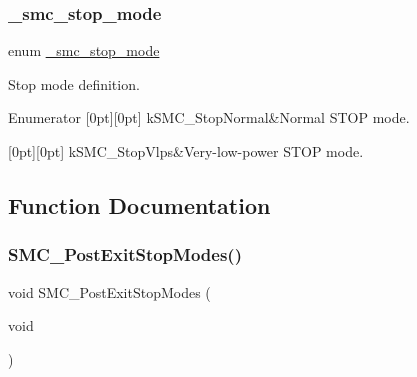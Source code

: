 \subsubsection{\texorpdfstring{\_smc\_stop\_mode}{\_smc\_stop\_mode}}
{\footnotesize\ttfamily enum \mbox{\hyperlink{group__smc_ga107d1c64902b4a1a0270a51008b854d5}{\+\_\+smc\+\_\+stop\+\_\+mode}}}



Stop mode definition. 

\begin{DoxyEnumFields}{Enumerator}
[0pt][0pt]{}\mbox{\label{group__smc_gga107d1c64902b4a1a0270a51008b854d5ac642d13640f334c1c509aa89568028dc}} 
k\+S\+M\+C\+\_\+\+Stop\+Normal&Normal S\+T\+OP mode. \\
\hline

[0pt][0pt]{}\mbox{\label{group__smc_gga107d1c64902b4a1a0270a51008b854d5a0309375b2672e8c29eebd50bd80236c3}} 
k\+S\+M\+C\+\_\+\+Stop\+Vlps&Very-\/low-\/power S\+T\+OP mode. \\
\hline

\end{DoxyEnumFields}


\subsection{Function Documentation}
\mbox{\label{group__smc_ga2ce7e977d78cbc1c355aea3b7acb1b4e}} 
\subsubsection{\texorpdfstring{SMC\_PostExitStopModes()}{SMC\_PostExitStopModes()}}
{\footnotesize\ttfamily void S\+M\+C\+\_\+\+Post\+Exit\+Stop\+Modes (\begin{DoxyParamCaption}\item[{void}]{ }\end{DoxyParamCaption})}



